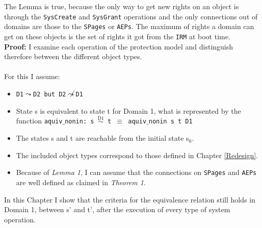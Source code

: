 \documentclass[11pt,a4paper, twoside, open=right]{scrreprt}
\begin{document}
The Lemma is true, because the only way to get new rights on an object is through the \texttt{SysCreate} and \texttt{SysGrant} operations and the only connections out of domains are those to the \texttt{SPages} or \texttt{AEPs}. The maximum of rights a domain can get on these objects is the set of rights it got from the \texttt{IRM} at boot time. \\
\textbf{Proof:}
I examine each operation of the protection model and distinguish therefore between the different object types. \\ \\
For this I assume:
\begin{itemize}
\item \texttt{D1$\leadsto$D2 but D2$\not\leadsto$D1}
\item State s is equivalent to state t for Domain 1, what is represented by the function \texttt{aquiv$\_$nonin: s $\overset{\text{D1}}{\sim}$ t $\equiv$ aquiv$\_$nonin s t D1}	
\item The states s and t are reachable from the initial state s$_0$.
\item The included object types correspond to those defined in Chapter \ref{Redesign}.
\item Because of \textit{Lemma 1}, I can assume that the connections on \texttt{SPages} and \texttt{AEPs} are well defined as claimed in \textit{Theorem 1}.
\end{itemize} 
In this Chapter I show that the criteria for the equivalence relation still holds in Domain 1, between s' and t', after the execution of every type of system operation. 
\clearpage

\clearpage

\clearpage
 
\clearpage

\clearpage

\clearpage

\clearpage

\clearpage
\end{document}
